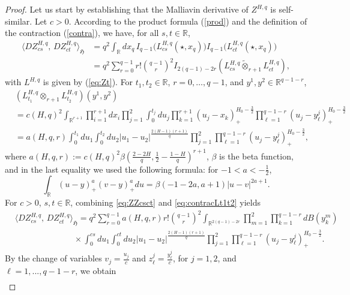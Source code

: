 \documentclass[a4paper,10pt]{article}
\theoremstyle{definition}
\theoremstyle{plain}
\newcommand{\R}{\mathbb{R}}
\newcommand\HHH{\mathfrak{H}}
\newcommand\1{\mathbbm{1}}
\begin{document}
\begin{proof}
Let us start by establishing that the Malliavin derivative of $Z^{H,q}$ is self-similar. Let $c>0$. According to the product formula (\ref{prod}) and the definition of the contraction (\ref{contra}), we have, for all $s,t \in \R$,
\begin{align}\label{eq:ZZcsct}
	\langle DZ^{H,q}_{cs},\, DZ^{H,q}_{ct}\rangle_{\HHH} &= q^{2} \int_{\R} dx_q\,  I_{q-1}\big(L _{cs}^{H,q}(\star, x_q)\big)I_{q-1}\big(L _{ct}^{H,q}(\star, x_q)\big)\nonumber\\
	&= q^{2} \sum_{r=0}^{q-1} r! \binom{q-1}{r}^2 I _{2(q-1)-2r}\left( L^{H,q}_{cs}\widetilde{\otimes} _{r+1} L_{ct} ^{H,q}\right),
\end{align}
with $L^{H,q}$ is given by (\ref{eq:Zt}). For $t_1,t_2\in \R$, $r=0,\ldots,q-1$, and   $y^{1},y^2\in \R^{q-1-r}$,
\begin{align}\label{eq:contracLt1t2}
	&(L^{H,q}_{t_1}\otimes _{r+1}L ^{H,q}_{t_2})(y^{1}, y^2)\nonumber\\
	&= c(H,q) ^{2} \int_{\R ^{r+1}}\prod_{i=1}^{r+1}dx_{i} \prod_{j=1}^{2}\int_{0} ^{t_j} du_j  \prod_{k=1}^{r+1}(u_j-x_{k})_{+} ^{H_0-\tfrac32}\prod_{\ell=1}^{q-1-r}(u_j-y^j_{\ell})_{+} ^{H_0-\tfrac32}\nonumber\\
	&=a(H,q,r) \int_{0}^{t_1}du_1 \int_{0} ^{t_2} du_2 \vert u_1-u_2\vert ^{\frac{2(H-1)(r+1)}{q}}\prod_{j=1}^{2}\prod_{\ell=1}^{q-1-r}(u_j-y^j_{\ell})_{+} ^{H_0-\tfrac32},
\end{align}
where $a(H,q,r):= c(H,q) ^{2} \beta \left( \frac{2-2H}{q}, \frac{1}{2}-\frac{1-H}{q}\right)^{r+1}$, $\beta$ is the beta function,  and in the last equality we used the following formula: for $-1<a<-\frac{1}{2}$,
$$\int_{\R}(u-y)_{+} ^{a} (v-y)_{+} ^{a} du= \beta(-1-2a, a+1)\vert u-v\vert ^{2a+1}.$$
For $c>0$, $s,t\in \R$, combining \eqref{eq:ZZcsct} and \eqref{eq:contracLt1t2} yields 
\begin{align*}
	&\langle DZ^{H,q}_{cs},\, DZ^{H,q}_{ct}\rangle_{\HHH} =q^{2} \sum_{r=0}^{q-1} a(H,q,r) r! \binom{q-1}{r}^2 \int_{\R ^{2(q-1)-2r}} \prod_{m=1}^{2}\prod_{k=1}^{q-1-r}dB(y^m_{k})\\ 
	&\qquad\qquad\qquad\quad \times \int_{0}^{cs}du_1 \int_{0} ^{ct} du_2 \vert u_1-u_2\vert ^{\frac{2(H-1)(r+1)}{q}}\prod_{j=1}^{2}\prod_{\ell=1}^{q-1-r}(u_j-y^j_{\ell})_{+} ^{H_0-\tfrac32}.
\end{align*}
By the change of variables $v_j=\frac{u_j}{c}$ and $z^j_{\ell}=\frac{y^j_{\ell}}{c}$, for $j=1,2$,  and $\ell=1,..., q-1-r$,   we obtain
\begin{align*}

\end{align*}
\end{proof}
\end{document}
